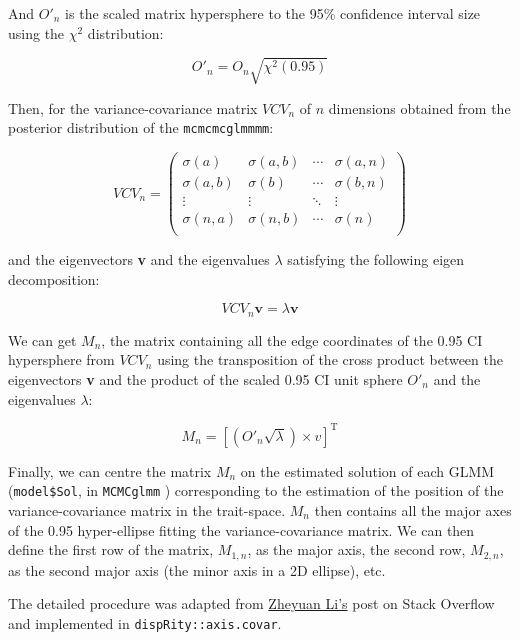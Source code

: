 \documentclass[12pt,letterpaper]{article}
\begin{document}
And $O'_{n}$ is the scaled matrix hypersphere to the 95\% confidence interval size using the $\chi^2$ distribution:

$$O'_{n} = O_{n} \sqrt{\chi^2(0.95)}$$

Then, for the variance-covariance matrix $VCV_{n}$ of $n$ dimensions obtained from the posterior distribution of the \texttt{mcmcmcglmmmm}:

\begin{equation}
VCV_{n} = 
    \begin{pmatrix}
        \sigma(a) & \sigma(a,b) & \cdots & \sigma(a,n) \\
        \sigma(a,b) & \sigma(b) & \cdots & \sigma(b,n) \\
        \vdots  & \vdots  & \ddots & \vdots  \\
        \sigma(n,a) & \sigma(n,b) & \cdots & \sigma(n) \\
    \end{pmatrix}
\end{equation}

and the eigenvectors \textbf{v} and the eigenvalues $\lambda$ satisfying the following eigen decomposition:

$$VCV_{n} \textbf{v} = \lambda \textbf{v}$$

We can get $M_{n}$, the matrix containing all the edge coordinates of the 0.95 CI hypersphere from $VCV_{n}$ using the transposition of the cross product between the eigenvectors \textbf{v} and the product of the scaled 0.95 CI unit sphere $O'_{n}$ and the eigenvalues $\lambda$:

$$M_{n} = [(O'_{n}\sqrt{\lambda}) \times v]^{\text{T}}$$

Finally, we can centre the matrix $M_{n}$ on the estimated solution of each GLMM (\texttt{model\$Sol}, in \texttt{MCMCglmm} \cite{MCMCglmm}) corresponding to the estimation of the position of the variance-covariance matrix in the trait-space.
$M_{n}$ then contains all the major axes of the 0.95 hyper-ellipse fitting the variance-covariance matrix.
We can then define the first row of the matrix, $M_{1,n}$, as the major axis, the second row, $M_{2,n}$, as the second major axis (the minor axis in a 2D ellipse), etc.

The detailed procedure was adapted from \href{https://stackoverflow.com/questions/40300217/obtain-vertices-of-the-ellipse-on-an-ellipse-covariance-plot-created-by-care/40316331#40316331}{Zheyuan Li's} post on Stack Overflow and implemented in \texttt{dispRity::axis.covar}.
\end{document}
